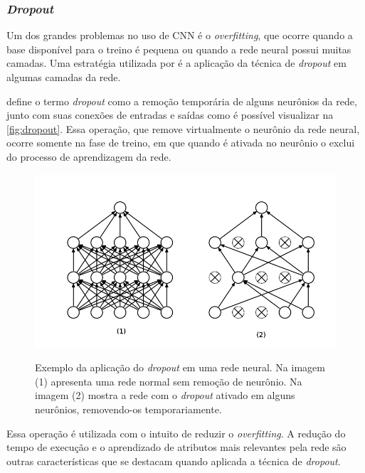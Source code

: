 \subsubsection{\textit{Dropout}}
Um dos grandes problemas no uso de CNN é o \textit{overfitting}, que ocorre quando a base disponível para o treino é pequena ou quando a rede neural possui muitas camadas. Uma estratégia utilizada por  é a aplicação da técnica de \textit{dropout} em algumas camadas da rede.
\par {} define o termo \textit{dropout} como a remoção temporária de alguns neurônios da rede, junto com suas conexões de entradas e saídas como é possível visualizar na \autoref{fig:dropout}. Essa operação, que remove virtualmente o neurônio da rede neural, ocorre somente na fase de treino, em que quando é ativada no neurônio o exclui do processo de aprendizagem da rede. 
\begin{figure}[H]
  \centering
  \caption{Exemplo da aplicação do \textit{dropout} em uma rede neural. Na imagem (1) apresenta uma rede normal sem remoção de neurônio. Na imagem (2) mostra a rede com o \textit{dropout} ativado em alguns neurônios, removendo-os temporariamente.}
  \includegraphics[width=400pt]{dados/figuras/dropout}
  \label{fig:dropout}
\end{figure} 
\par Essa operação é utilizada com o intuito de reduzir o \textit{overfitting}. A redução do tempo de execução e o aprendizado de atributos mais relevantes pela rede são outras características que se destacam quando aplicada a técnica de \textit{dropout}.

